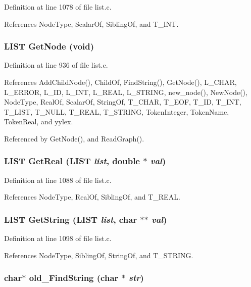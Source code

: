 Definition at line 1078 of file list.c.

References Node\-Type, Scalar\-Of, Sibling\-Of, and T\_\-INT.
\subsubsection{\setlength{\rightskip}{0pt plus 5cm}\bf{LIST} Get\-Node (void)}\label{list_8h_b0c44cb8e74f854814958212aaab6408}




Definition at line 936 of file list.c.

References Add\-Child\-Node(), Child\-Of, Find\-String(), Get\-Node(), L\_\-CHAR, L\_\-ERROR, L\_\-ID, L\_\-INT, L\_\-REAL, L\_\-STRING, new\_\-node(), New\-Node(), Node\-Type, Real\-Of, Scalar\-Of, String\-Of, T\_\-CHAR, T\_\-EOF, T\_\-ID, T\_\-INT, T\_\-LIST, T\_\-NULL, T\_\-REAL, T\_\-STRING, Token\-Integer, Token\-Name, Token\-Real, and yylex.

Referenced by Get\-Node(), and Read\-Graph().
\subsubsection{\setlength{\rightskip}{0pt plus 5cm}\bf{LIST} Get\-Real (\bf{LIST} {\em list}, double $\ast$ {\em val})}\label{list_8h_c6e4ef39bbdabddec435b0fb40116354}




Definition at line 1088 of file list.c.

References Node\-Type, Real\-Of, Sibling\-Of, and T\_\-REAL.
\subsubsection{\setlength{\rightskip}{0pt plus 5cm}\bf{LIST} Get\-String (\bf{LIST} {\em list}, char $\ast$$\ast$ {\em val})}\label{list_8h_20272db4a1f8faaab032a53689f15ebd}




Definition at line 1098 of file list.c.

References Node\-Type, Sibling\-Of, String\-Of, and T\_\-STRING.
\subsubsection{\setlength{\rightskip}{0pt plus 5cm}char$\ast$ old\_\-Find\-String (char $\ast$ {\em str})}\label{list_8h_4e0e7d8552688931b3a78bc432005db0}




